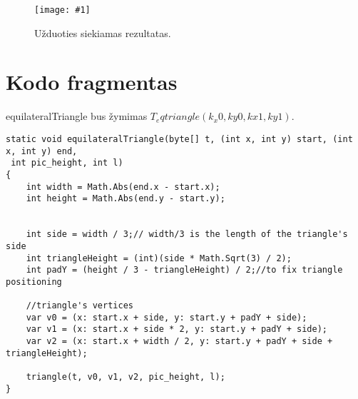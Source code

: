 \documentclass[a4paper,12pt]{article}
\newcommand{\imgc}[4]{
    \begin{figure}[h!]
        \centering
        \texttt{[image: \#1]}
        \caption{#3}  %
        \label{#4}  %
    \end{figure}
}
\begin{document}
\imgc{nuotraukos/Uzduotis.png}{0.8}{Užduoties siekiamas rezultatas.}{}

\section{Kodo fragmentas}

equilateralTriangle bus žymimas $T_eqtriangle(k_x0, ky0, kx1, ky1).$


\lstset{style=csharpstyle}
\begin{lstlisting}
static void equilateralTriangle(byte[] t, (int x, int y) start, (int x, int y) end,
 int pic_height, int l)
{
    int width = Math.Abs(end.x - start.x);
    int height = Math.Abs(end.y - start.y);


    int side = width / 3;// width/3 is the length of the triangle's side
    int triangleHeight = (int)(side * Math.Sqrt(3) / 2);
    int padY = (height / 3 - triangleHeight) / 2;//to fix triangle positioning

    //triangle's vertices
    var v0 = (x: start.x + side, y: start.y + padY + side);
    var v1 = (x: start.x + side * 2, y: start.y + padY + side);
    var v2 = (x: start.x + width / 2, y: start.y + padY + side + triangleHeight);

    triangle(t, v0, v1, v2, pic_height, l);
}

\end{lstlisting}

 
\end{document}
